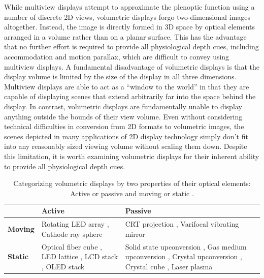 While multiview displays attempt to approximate the plenoptic function using a number of discrete 2D views, volumetric displays forgo two-dimensional images altogether. Instead, the image is directly formed in 3D space by optical elements arranged in a volume rather than on a planar surface. This has the advantage that no further effort is required to provide all physiological depth cues, including accommodation and motion parallax, which are difficult to convey using multiview displays. A fundamental disadvantage of volumetric displays is that the display volume is limited by the size of the display in all three dimensions. Multiview displays are able to act as a ``window to the world'' in that they are capable of displaying scenes that extend arbitrarily far into the space behind the display. In contrast, volumetric displays are fundamentally unable to display anything outside the bounds of their view volume. Even without considering technical difficulties in conversion from 2D formats to volumetric images, the scenes depicted in many applications of 2D display technology simply don't fit into any reasonably sized viewing volume without scaling them down. Despite this limitation, it is worth examining volumetric displays for their inherent ability to provide all physiological depth cues.

\begin{table}
    \caption{Categorizing volumetric displays by two properties of their optical elements: Active or passive and moving or static \cite{Geng_2013}.}
    \label{tab:volumetric}
    \begin{tabularx}{\linewidth}{l Y Y}
        \toprule
        & \textbf{Active} & \textbf{Passive} \\
        \midrule
        \textbf{Moving} & Rotating LED array \cite{Schipper_Coddington_1963}, Cathode ray sphere \cite{Ketchpel_1964} & CRT projection \cite{Max_1961}, Varifocal vibrating mirror \cite{Sher_1978} \\
        \midrule
        \textbf{Static} & Optical fiber cube \cite{MacFarlane_1994}, LED lattice \cite{Wyatt_Wujanto}, LCD stack \cite{Leung_Ives_Eng_1998,Sadovnik_Rizkin_1998}, OLED stack \cite{Koo_Kim_2009}& Solid state upconversion \cite{Lewis_Verber_McGhee_1971, Downing_1997, Langhans_Guill_Rieper_Oltmann_Bahr_2003}, Gas medium upconversion \cite{Korevaar_Spivey_1989}, Crystal upconversion \cite{Zhu_Qian_Liu_Xu_Liu_Chen_Zhou_Liu_Qiu_2017}, Crystal cube \cite{Nayar_Anand_2007}, Laser plasma \cite{Momiuchi_Kimura_2009}\\
        \bottomrule
    \end{tabularx}
\end{table}

